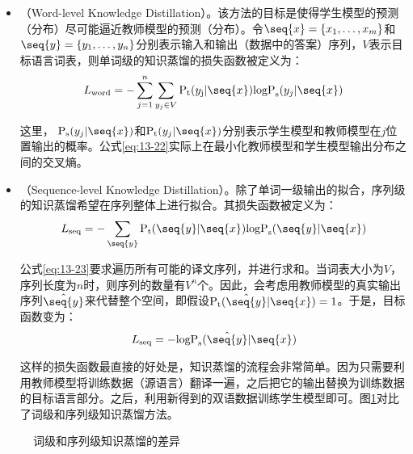 \begin{itemize}
\vspace{0.5em}
\item {\small{}}（Word-level Knowledge Distillation）。该方法的目标是使得学生模型的预测（分布）尽可能逼近教师模型的预测（分布）。令$\seq{x}=\{x_1,\ldots,x_m\}$和$\seq{y}=\{y_1,\ldots,y_n\}$分别表示输入和输出（数据中的答案）序列，$V$表示目标语言词表，则单词级的知识蒸馏的损失函数被定义为：
\begin{eqnarray}
L_{\textrm{word}} = - \sum_{j=1}^n \sum_{y_j \in V} \textrm{P}_{\textrm{t}} (y_{\textrm{j}}|\seq{x})\textrm{logP}_{\textrm{s}}(y_j|\seq{x})
\label{eq:13-22}
\end{eqnarray}

这里， $\textrm{P}_{\textrm{s}}(y_j|\seq{x})$和$\textrm{P}_{\textrm{t}} (y_j|\seq{x})$分别表示学生模型和教师模型在$j$位置输出的概率。公式\eqref{eq:13-22}实际上在最小化教师模型和学生模型输出分布之间的交叉熵。
\vspace{0.5em}
\item {\small{}}（Sequence-level Knowledge Distillation）。除了单词一级输出的拟合，序列级的知识蒸馏希望在序列整体上进行拟合。其损失函数被定义为：
\begin{eqnarray}
L_{\textrm{seq}} = - \sum_{\seq{y}}\textrm{P}_{\textrm{t}} (\seq{y}|\seq{x})\textrm{logP}_{\textrm{s}}(\seq{y}|\seq{x})
\label{eq:13-23}
\end{eqnarray}

公式\eqref{eq:13-23}要求遍历所有可能的译文序列，并进行求和。当词表大小为$V$，序列长度为$n$时，则序列的数量有$V^n$个。因此，会考虑用教师模型的真实输出序列$\hat{\seq{y}}$来代替整个空间，即假设$\textrm{P}_{\textrm{t}}(\hat{\seq{y}}|\seq{x})=1$。于是，目标函数变为：
\begin{eqnarray}
L_{\textrm{seq}} = - \textrm{logP}_{\textrm{s}}(\hat{\seq{y}} | \seq{x})
\label{eq:13-24}
\end{eqnarray}

这样的损失函数最直接的好处是，知识蒸馏的流程会非常简单。因为只需要利用教师模型将训练数据（源语言）翻译一遍，之后把它的输出替换为训练数据的目标语言部分。之后，利用新得到的双语数据训练学生模型即可。图\ref{fig:13-12}对比了词级和序列级知识蒸馏方法。
\vspace{0.5em}
\end{itemize}

\begin{figure}[htp]
\centering

\caption{词级和序列级知识蒸馏的差异}
\label{fig:13-12}
\end{figure}

